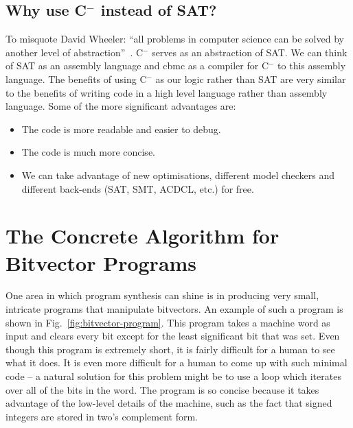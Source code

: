 \documentclass[a4paper]{llncs}
\newcommand{\newC}{C$^-$\xspace}
\begin{document}
\subsection{Why use \newC instead of SAT?}
To misquote David Wheeler: ``all problems in computer science can be solved by
another level of abstraction''~\cite{beautiful-code}.  \newC serves as
an abstraction of SAT.  We can think of SAT as an assembly language and
{\sc cbmc} as a compiler for \newC to this assembly language.  The benefits
of using \newC as our logic rather than SAT are very similar to the benefits of
writing code in a high level language rather than assembly language.
Some of the more significant advantages are:

\begin{itemize}
 \item The code is more readable and easier to debug.
 \item The code is much more concise.
 \item We can take advantage of new optimisations, different model
 checkers and different back-ends (SAT, SMT, ACDCL, etc.) for free.
\end{itemize}


\section{The Concrete Algorithm for Bitvector Programs}

One area in which program synthesis can shine is in producing very small,
intricate programs that manipulate bitvectors.  An example of such a program
is shown in Fig.~\ref{fig:bitvector-program}.  This program takes a machine word
as input and clears every bit except for the least significant bit that was set.
Even though this program is extremely short, it is fairly difficult for a human
to see what it does.  It is even more difficult for a human to come up with such
minimal code -- a natural solution for this problem might be to use a loop which
iterates over all of the bits in the word.  The program is so concise because it
takes advantage of the low-level details of the machine, such as the fact that
signed integers are stored in two's complement form.
\end{document}
